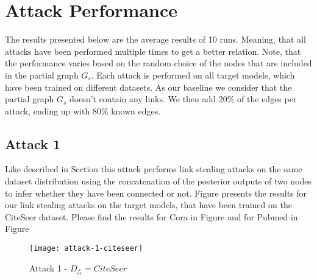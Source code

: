     \section{Attack Performance}
        The results presented below are the average results of 10 runs.
        Meaning, that all attacks have been performed multiple times to get a better relation.
        Note, that the performance varies based on the random choice of the nodes that are included in the partial graph $G_s$.
        Each attack is performed on all target models, which have been trained on different datasets.
        As our baseline we consider that the partial graph $G_s$ doesn't contain any links.
        We then add 20\% of the edges per attack, ending up with 80\% known edges.

        \subsection*{Attack 1}
            Like described in Section  this attack performs link stealing attacks on the same dataset distribution using the concatenation of the posterior outputs of two nodes to infer whether they have been connected or not. 
            Figure  presents the results for our link stealing attacks on the target models, that have been trained on the CiteSeer dataset.
            Please find the results for Cora in Figure  and for Pubmed in Figure 

            \begin{figure}[h]
                \begin{center}
                    \texttt{[image: attack-1-citeseer]}
                    \caption{Attack 1 - $D_{f_t} = CiteSeer$}
                    \label{figure:eval-att1-citeseer}
                \end{center}
            \end{figure}

